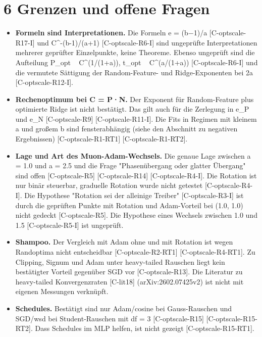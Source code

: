 \documentclass[10pt,twocolumn]{article}
\begin{document}
\section{6 Grenzen und offene Fragen}

\begin{itemize}
\item \textbf{Formeln sind Interpretationen.} Die Formeln e = (b−1)/a {\scriptsize[C-optscale-R17-I]} und C^-(b-1)/(a+1) {\scriptsize[C-optscale-R6-I]} sind ungeprüfte Interpretationen mehrerer geprüfter Einzelpunkte, keine Theoreme. Ebenso ungeprüft sind die Aufteilung P_opt ~ C^(1/(1+a)), t_opt ~ C^(a/(1+a)) {\scriptsize[C-optscale-R6-I]} und die vermutete Sättigung der Random-Feature- und Ridge-Exponenten bei 2a {\scriptsize[C-optscale-R12-I]}.
\item \textbf{Rechenoptimum bei C = P·N.} Der Exponent für Random-Feature plus optimierte Ridge ist nicht bestätigt. Das gilt auch für die Zerlegung in e_P und e_N {\scriptsize[C-optscale-R9]} {\scriptsize[C-optscale-R11-I]}. Die Fits in Regimen mit kleinem a und großem b sind fensterabhängig (siehe den Abschnitt zu negativen Ergebnissen) {\scriptsize[C-optscale-R1-RT1]} {\scriptsize[C-optscale-R1-RT2]}.
\item \textbf{Lage und Art des Muon-Adam-Wechsels.} Die genaue Lage zwischen a = 1.0 und a = 2.5 und die Frage "Phasenübergang oder glatter Übergang" sind offen {\scriptsize[C-optscale-R5]} {\scriptsize[C-optscale-R14]} {\scriptsize[C-optscale-R4-I]}. Die Rotation ist nur binär steuerbar, graduelle Rotation wurde nicht getestet {\scriptsize[C-optscale-R4-I]}. Die Hypothese "Rotation sei der alleinige Treiber" {\scriptsize[C-optscale-R3-I]} ist durch die geprüften Punkte mit Rotation und Adam-Vorteil bei (1.0, 1.0) nicht gedeckt {\scriptsize[C-optscale-R5]}. Die Hypothese eines Wechsels zwischen 1.0 und 1.5 {\scriptsize[C-optscale-R5-I]} ist ungeprüft.
\item \textbf{Shampoo.} Der Vergleich mit Adam ohne und mit Rotation ist wegen Randoptima nicht entscheidbar {\scriptsize[C-optscale-R2-RT1]} {\scriptsize[C-optscale-R4-RT1]}. Zu Clipping, Signum und Adam unter heavy-tailed Rauschen liegt kein bestätigter Vorteil gegenüber SGD vor {\scriptsize[C-optscale-R13]}. Die Literatur zu heavy-tailed Konvergenzraten {\scriptsize[C-lit18]} (arXiv:2602.07425v2) ist nicht mit eigenen Messungen verknüpft.
\item \textbf{Schedules.} Bestätigt sind nur Adam/cosine bei Gauss-Rauschen und SGD/wsd bei Student-Rauschen mit df = 3 {\scriptsize[C-optscale-R15]} {\scriptsize[C-optscale-R15-RT2]}. Dass Schedules im MLP helfen, ist nicht gezeigt {\scriptsize[C-optscale-R15-RT1]}.

\end{itemize}
\end{document}
